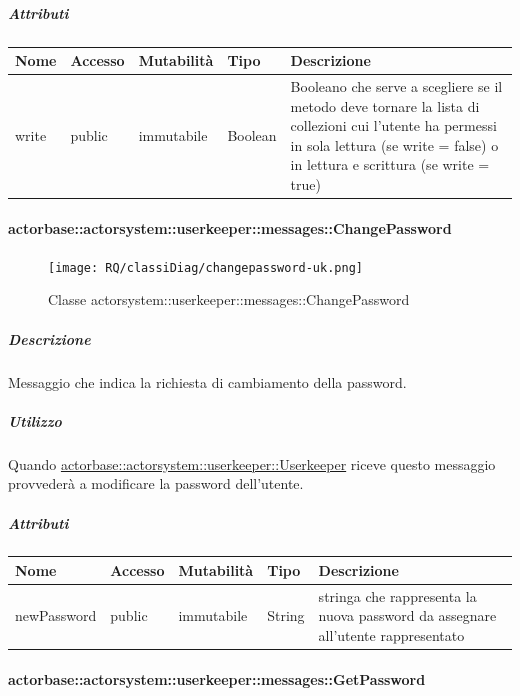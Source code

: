 \documentclass{scalatekids-article}
\begin{document}
\subparagraph{Attributi}
\begin{tabular}{| p{3cm} | p{1.5cm} | p{2cm} | p{2cm} | p{8.5cm} |}
  \hline
  Nome & Accesso & Mutabilità & Tipo & Descrizione\\
  \hline
  write & public & immutabile & Boolean & Booleano che serve a scegliere se il metodo deve tornare la lista di collezioni cui l'utente ha permessi in sola lettura (se write = false) o in lettura e scrittura (se write = true) \\
  \hline
\end{tabular}


\paragraph{actorbase::actorsystem::userkeeper::messages::ChangePassword}
\label{sec:actorbase::actorsystem::userkeeper::messages::ChangePassword}

\begin{figure}[H]
  \begin{center}
    \texttt{[image: RQ/classiDiag/changepassword-uk.png]}
    \caption{Classe actorsystem::userkeeper::messages::ChangePassword}
  \end{center}
\end{figure}

\subparagraph{Descrizione}
Messaggio che indica la richiesta di cambiamento della password.

\subparagraph{Utilizzo}
Quando \hyperref[sec:actorbase::actorsystem::userkeeper::Userkeeper]{actorbase::\allowbreak{}actorsystem::\allowbreak{}userkeeper::\allowbreak{}Userkeeper}
riceve questo messaggio provvederà a modificare la password dell'utente.

\subparagraph{Attributi}
\begin{tabular}{| p{3cm} | p{1.5cm} | p{2cm} | p{2cm} | p{8.5cm} |}
  \hline
  Nome & Accesso & Mutabilità & Tipo & Descrizione\\
  \hline
  newPassword & public & immutabile & String & stringa che rappresenta la nuova password da assegnare all'utente rappresentato \\
  \hline
\end{tabular}


\paragraph{actorbase::actorsystem::userkeeper::messages::GetPassword}
\label{sec:actorbase::actorsystem::userkeeper::messages::GetPassword}
\end{document}
